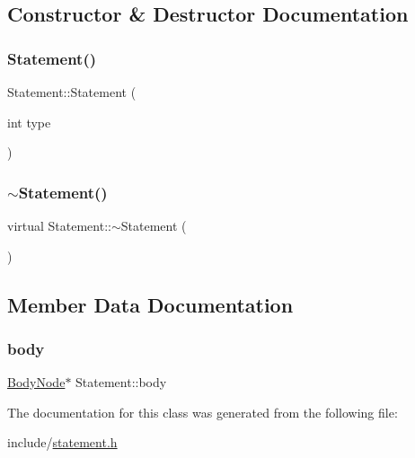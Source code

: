 \subsection{Constructor \& Destructor Documentation}
\mbox{\label{classStatement_a6fb78974779f1f546206a6f301d0fbee}} 
\subsubsection{\texorpdfstring{Statement()}{Statement()}}
{\footnotesize\ttfamily Statement\+::\+Statement (\begin{DoxyParamCaption}\item[{int}]{type }\end{DoxyParamCaption})}

\mbox{\label{classStatement_aebe8ef20fbd0a932ebb33f6cef555a6d}} 
\subsubsection{\texorpdfstring{$\sim$\+Statement()}{~Statement()}}
{\footnotesize\ttfamily virtual Statement\+::$\sim$\+Statement (\begin{DoxyParamCaption}{ }\end{DoxyParamCaption})\hspace{0.3cm}{\ttfamily [virtual]}}



\subsection{Member Data Documentation}
\mbox{\label{classStatement_a0aa31d3fbf036cf665062db876341f63}} 
\subsubsection{\texorpdfstring{body}{body}}
{\footnotesize\ttfamily \hyperlink{classBodyNode}{Body\+Node}$\ast$ Statement\+::body}



The documentation for this class was generated from the following file\+:\begin{DoxyCompactItemize}
\item 
include/\hyperlink{statement_8h}{statement.\+h}\end{DoxyCompactItemize}
